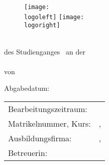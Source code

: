 \thispagestyle{empty}
\begin{titlepage}
	\enlargethispage{2.0cm}
	
	\begin{figure}
		\vspace*{-2cm}
		\texttt{[image: \\logoleft]}
		\hfill
		\texttt{[image: \\logoright]}\\[5ex]
	\end{figure}
	
	\vfill
	
	\begin{center}
		\begin{minipage}{\widthoftitle\textwidth}
			\centering
			\textsf{\huge{\textsc{\textbf{\MakeLowercase{\titleofwork}}}}}
		\end{minipage}
	\end{center}
	
	\vfill
	
	\begin{center}
		\Large{\textsc{\MakeLowercase{\typeofwork}}}\\[4ex]
		\large{des Studienganges \courseofstudies~an der}\\[1ex]
		\large{\university}\\[4ex]
		\large{von}\\[1ex] 
		\large{\textbf{\authorofwork}}
		
	\end{center}
	
	\vfill
	
	\begin{center}
		Abgabedatum:\\\dateofsubmission
	\end{center}
	
	\vfill
	
	\begin{flushleft}		
		\begin{tabular}{ll} %
			Bearbeitungszeitraum: 			& \quad \periodoftime \\ 
			Matrikelnummer, Kurs: 			& \quad \studentnumber , \nameofclass \\ 
			Ausbildungsfirma: 				& \quad \company, \companyheadquarter \\ 
			Betreuerin:	& \quad \supervisor \\ 
		\end{tabular} 
	\end{flushleft}	
\end{titlepage}

